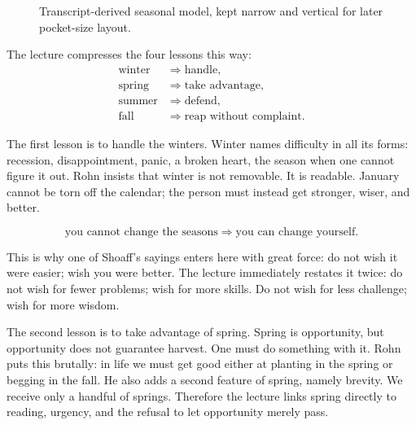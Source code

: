 \begin{figure}[h]
\centering
{}
\caption{Transcript-derived seasonal model, kept narrow and vertical for later pocket-size layout.}
\end{figure}

The lecture compresses the four lessons this way:
\begin{align}
\text{winter} &\Rightarrow \text{handle},\\
\text{spring} &\Rightarrow \text{take advantage},\\
\text{summer} &\Rightarrow \text{defend},\\
\text{fall} &\Rightarrow \text{reap without complaint}.
\end{align}

The first lesson is to handle the winters. Winter names difficulty in all its forms: recession, disappointment, panic, a broken heart, the season when one cannot figure it out. Rohn insists that winter is not removable. It is readable. January cannot be torn off the calendar; the person must instead get stronger, wiser, and better.

\begin{equation}
\text{you cannot change the seasons} \Rightarrow \text{you can change yourself}.
\end{equation}

This is why one of Shoaff's sayings enters here with great force: do not wish it were easier; wish you were better. The lecture immediately restates it twice: do not wish for fewer problems; wish for more skills. Do not wish for less challenge; wish for more wisdom.

The second lesson is to take advantage of spring. Spring is opportunity, but opportunity does not guarantee harvest. One must do something with it. Rohn puts this brutally: in life we must get good either at planting in the spring or begging in the fall. He also adds a second feature of spring, namely brevity. We receive only a handful of springs. Therefore the lecture links spring directly to reading, urgency, and the refusal to let opportunity merely pass.

